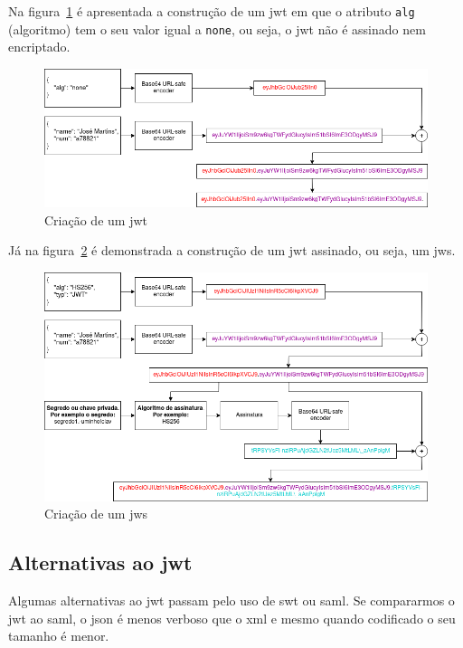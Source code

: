 Na figura~\ref{fig:buildJWT} é apresentada a construção de um \acrshort{jwt} em que o atributo \texttt{alg} (algoritmo) tem o seu valor igual a \texttt{none}, ou seja, o \acrshort{jwt} não é assinado nem encriptado.

\begin{figure}[H]
    \centering
    \includegraphics[width=1\textwidth]{img/buildJWT.png}
    \caption{Criação de um \acrshort{jwt}}\label{fig:buildJWT}
\end{figure}

Já na figura~\ref{fig:buildJWS} é demonstrada a construção de um \acrshort{jwt} assinado, ou seja, um \acrshort{jws}.

\begin{figure}[H]
    \centering
    \includegraphics[width=1\textwidth]{img/buildJWS.png}
    \caption{Criação de um \acrshort{jws}}\label{fig:buildJWS}
\end{figure}

\subsection{Alternativas ao \acrshort{jwt}}

Algumas alternativas ao \acrshort{jwt} passam pelo uso de \acrfull{swt} ou \acrfull{saml}. Se compararmos o \acrshort{jwt} ao \acrshort{saml}, o \acrshort{json} é menos verboso que o \acrshort{xml} e mesmo quando codificado o seu tamanho é menor. 


